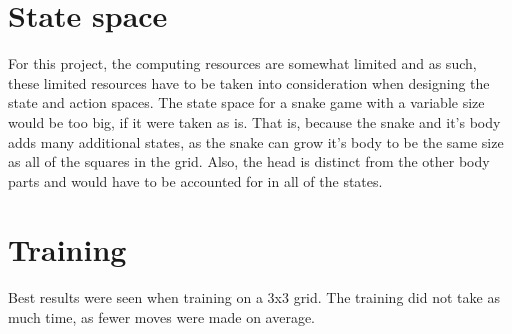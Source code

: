 \documentclass[lettersize,journal]{IEEEtran}
\begin{document}
\section{State space}
For this project, the computing resources are somewhat limited and
as such, these limited resources have to be taken into consideration
when designing the state and action spaces.
The state space for a snake game with a variable size would be
too big, if it were taken as is. That is, because the snake and
it's body adds many additional states, as the snake can grow it's body to
be the same size as all of the squares in the grid. Also, the head is distinct
from the other body parts and would have to be accounted for in all of the states.


\section{Training}
Best results were seen when training on a 3x3 grid.
The training did not take as much time, as fewer moves
were made on average.


\end{document}
